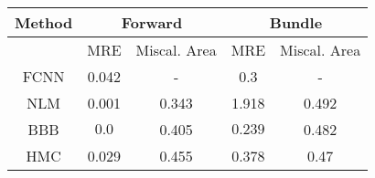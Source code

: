 \documentclass[convert={outext=.png}]{standalone}
\begin{document}
\centering
\label{tab:experimental_results}



\begin{tabular}{c c c c c}
\hline
\hline
Method &  \multicolumn{2}{c}{Forward} & \multicolumn{2}{c}{Bundle} \\ \hline
 & MRE & Miscal. Area & MRE & Miscal. Area\\
 FCNN & 0.042 & - & 0.3 & - \\
 \hline
 NLM & 0.001 & 0.343 & 1.918 & 0.492 \\
 BBB & $\mathbf{0.0}$ & 0.405 & $\mathbf{0.239}$ & 0.482 \\
 HMC & 0.029 & 0.455 & 0.378 & 0.47 \\
\hline
\hline
\end{tabular}
\end{document}
